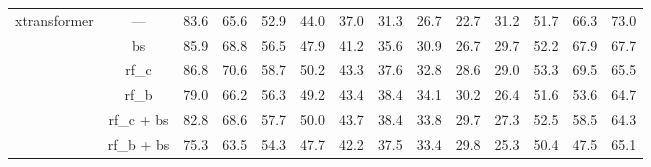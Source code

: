 \documentclass[journal,comsoc]{IEEEtran}
\begin{document}
\begin{table*}[htp]
\begin{tabular}{l|c|cccccccccccc}
\multirow{6}{*}{xtransformer \cite{pan2020x}}   & ---   & 83.6   &   65.6   &   52.9   &   44.0   &   37.0   &   31.3   &   26.7   &   22.7   &   31.2   &   51.7   &   66.3   &   73.0    \\
                                          & bs    & 85.9   &   68.8   &   56.5   &   47.9   &   41.2   &   35.6   &   30.9   &   26.7   &   29.7   &   52.2   &   67.9   &   67.7    \\
                                          & rf\_c   & 86.8   &   70.6   &   58.7   &   50.2   &   43.3   &   37.6   &   32.8   &   28.6   &   29.0   &   53.3   &   69.5   &   65.5    \\
                                          & rf\_b   &  79.0   &   66.2   &   56.3   &   49.2   &   43.4   &   38.4   &   34.1    &   30.2   &   26.4   &   51.6   &   53.6   &   64.7    \\
                                          & rf\_c + bs  & 82.8   &   68.6   &   57.7   &   50.0   &   43.7   &   38.4   &   33.8   &   29.7   &   27.3   &   52.5   &   58.5   &   64.3    \\
                                          & rf\_b + bs  &  75.3   &   63.5   &   54.3   &   47.7   &   42.2   &   37.5   &   33.4   &   29.8   &   25.3   &   50.4   &   47.5   &   65.1    \\ \hline
\end{tabular}
\end{table*}
\end{document}
